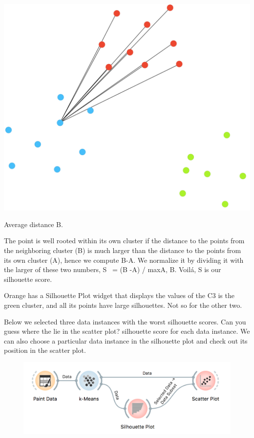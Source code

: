 \begin{marginfigure}
    \centering
    \includegraphics[scale=0.25]{silhouette-pt2.png}
    \caption{Average distance B.}
\end{marginfigure}

The point is well rooted within its own cluster if the distance to the points from the neighboring cluster (B) is much larger than the distance to the points from its own cluster (A), hence we compute B-A. We normalize it by dividing it with the larger of these two numbers, S  = (B -A) / max{A, B}. Voilá, S is our silhouette score.

Orange has a Silhouette Plot widget that displays the values of the
C3 is the green cluster, and all its points have large silhouettes. Not so for the other two. 

Below we selected three data instances with the worst silhouette scores. Can you guess where the lie in the scatter plot? silhouette score for each data instance. We can also choose a particular data instance in the silhouette plot and check out its position in the scatter plot.

\begin{figure}[h]
    \centering
    \includegraphics[width=\linewidth]{silhouette-workflow.png}
    \caption{$\;$} %
\end{figure}

